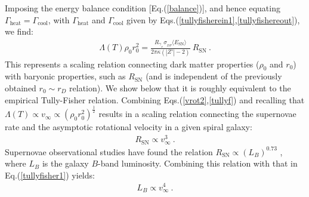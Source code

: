 \documentclass[12pt]{article}
\begin{document}
{{Imposing the energy balance condition [Eq.(\ref{balance})], and hence equating $\Gamma _{\text{heat}} = \Gamma _{\text{cool}}$, with $\Gamma _{\text{heat}}$ and $\Gamma _{\text{cool}}$ given by Eqs.(\ref{tullyfisherein1},\ref{tullyfishereout}), we find:
%
\begin{eqnarray}
\Lambda (T)\rho _0 r _0 ^2 = \frac{R _{\gamma _{_D}}\sigma _{_{DP}}\langle E _{\text{SN}} \rangle}{2\pi \kappa (|Z'|-2)} \ R _{\text{SN}} \ .
\label{tullyf}
\end{eqnarray}
%
This represents a scaling relation connecting dark matter properties ($\rho _0$ and $ r_0$) with baryonic properties, such as $R _{\text{SN}}$ (and is independent of the previously obtained $r _0 \sim r _D$ relation). We show below that it is roughly equivalent to the empirical Tully-Fisher relation. Combining Eqs.(\ref{vrot2},\ref{tullyf}) and recalling that $\Lambda (T) \propto v _{\infty} \propto \left ( \rho _0 r _0 ^2 \right ) ^{\frac{1}{2}}$ results in a scaling relation connecting the supernovae rate and the asymptotic rotational velocity in a given spiral galaxy:
%
\begin{eqnarray}
R _{\text{SN}} \propto v _{\infty} ^3 \ .
\label{tullyfisher1}
\end{eqnarray}
%
Supernovae observational studies have found the relation $R _{\text{SN}} \propto \left ( L _B \right ) ^{0.73}$ \cite{wli}, where $L _B$ is the galaxy $B$-band luminosity. Combining this relation with that in Eq.(\ref{tullyfisher1}) yields:
%
\begin{eqnarray}
L _B \propto v _{\infty} ^4 \ .
\label{tullyfisher}
\end{eqnarray}
%
}}
\end{document}
